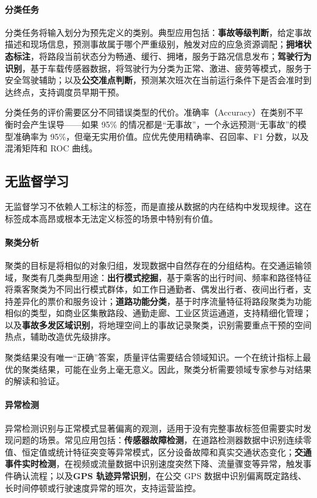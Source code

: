 \paragraph{分类任务}

分类任务将输入划分为预先定义的类别。典型应用包括：\textbf{事故等级判断}，给定事故描述和现场信息，预测事故属于哪个严重级别，触发对应的应急资源调配；\textbf{拥堵状态标注}，将路段当前状态分为畅通、缓行、拥堵，服务于路况信息发布；\textbf{驾驶行为识别}，基于车载传感器数据，将驾驶行为分类为正常、激进、疲劳等模式，服务于安全驾驶辅助；以及\textbf{公交准点判断}，预测某次班次在当前运行条件下是否会准时到达终点，支持调度员早期干预。

分类任务的评价需要区分不同错误类型的代价。准确率（Accuracy）在类别不平衡时会产生误导——如果 95\% 的情况都是“无事故”，一个永远预测“无事故”的模型准确率为 95\%，但毫无实用价值。应优先使用精确率、召回率、F1 分数，以及混淆矩阵和 ROC 曲线。

\subsection{无监督学习}

无监督学习不依赖人工标注的标签，而是直接从数据的内在结构中发现规律。这在标签成本高昂或根本无法定义标签的场景中特别有价值。

\paragraph{聚类分析}

聚类的目标是将相似的对象归组，发现数据中自然存在的分组结构。在交通运输领域，聚类有几类典型用途：\textbf{出行模式挖掘}，基于乘客的出行时间、频率和路径特征将乘客聚类为不同出行模式群体，如工作日通勤者、偶发出行者、夜间出行者，支持差异化的票价和服务设计；\textbf{道路功能分类}，基于时序流量特征将路段聚类为功能相似的类型，如商业区集散路段、通勤走廊、工业区货运通道，支持精细化管理；以及\textbf{事故多发区域识别}，将地理空间上的事故记录聚类，识别需要重点干预的空间热点，辅助改造优先级排序。

聚类结果没有唯一“正确”答案，质量评估需要结合领域知识。一个在统计指标上最优的聚类结果，可能在业务上毫无意义。因此，聚类分析需要领域专家参与对结果的解读和验证。

\paragraph{异常检测}

异常检测识别与正常模式显著偏离的观测，适用于没有完整事故标签但需要实时发现问题的场景。常见应用包括：\textbf{传感器故障检测}，在道路检测器数据中识别连续零值、恒定值或统计特征突变等异常模式，区分设备故障和真实交通状态变化；\textbf{交通事件实时检测}，在视频或流量数据中识别速度突然下降、流量骤变等异常，触发事件确认流程；以及\textbf{GPS 轨迹异常识别}，在公交 GPS 数据中识别偏离既定路线、长时间停顿或行驶速度异常的班次，支持运营监控。

